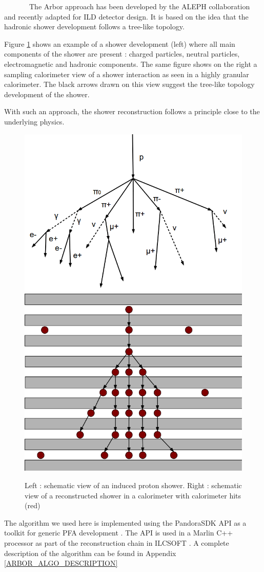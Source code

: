\documentclass[cits]{JINST}
\begin{document}
~~~~~~~The Arbor approach has been developed by the ALEPH collaboration and recently adapted \cite{arbor-manqi} for ILD detector design. It is based on the idea that the hadronic shower development follows a tree-like topology.

Figure \ref{ARBOR_STRUCTURE} shows an example of a shower development (left) where all main components of the shower are present : charged particles, neutral particles, electromagnetic and hadronic components.
The same figure shows on the right a sampling calorimeter view of a shower interaction as seen in a highly granular calorimeter. The black arrows drawn on this view suggest the tree-like topology development of the shower.

With such an approach, the shower reconstruction follows a principle close to the underlying physics.

\begin{figure}[!ht]
  \begin{center}
    \includegraphics[width=0.45\linewidth]{ProtonDecay.png} \hfill
    \includegraphics[width=0.45\linewidth]{ArborSchema.png}
  \end{center}
  \caption{\label{ARBOR_STRUCTURE} Left : schematic view of an induced proton shower. Right : schematic view of a reconstructed shower in a calorimeter with calorimeter hits (red)}
\end{figure}

The algorithm we used here is implemented using the PandoraSDK API as a toolkit for generic PFA development \cite{pandora-sdk}. The API is used in a Marlin \cite{marlin-lccd} C++ processor as part of the reconstruction chain in ILCSOFT \cite{ilcsoft}. A complete description of the algorithm can be found in Appendix \ref{ARBOR_ALGO_DESCRIPTION}
\end{document}

